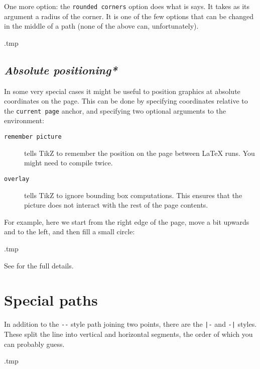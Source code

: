 One more option: the \verb|rounded corners| option does what is says.
It takes as its argument a radius of the corner.
It is one of the few options that can be changed in the middle of a path
(none of the above can, unfortunately).
%
\begin{VerbatimOut}{\jobname.tmp}
\end{VerbatimOut}
\ShowExample


%
%
\subsection{\emph{Absolute positioning*}}\label{sec:tikz absolute}

In some very special cases it might be useful to position graphics at absolute coordinates on the page.
This can be done by specifying coordinates relative to the \verb|current page| anchor,
and specifying two optional arguments to the environment:
\begin{description}
\item[\texttt{remember picture}] tells TikZ to remember the position on the page between \LaTeX{} runs.
    You might need to compile twice.
\item[\texttt{overlay}] tells TikZ to ignore bounding box computations.
    This ensures that the picture does not interact with the rest of the page contents.
\end{description}

For example, here we start from the right edge of the page,
move a bit upwards and to the left, and then fill a small circle:
%
\begin{VerbatimOut}{\jobname.tmp}
\end{VerbatimOut}
\ExecuteExample
%
See \cite[Section~17.3.2]{tikz} for the full details.



%
%
%
\section{Special paths}

In addition to the \verb|--| style path joining two points,
there are the \verb$|-$ and \verb$-|$ styles.
These split the line into vertical and horizontal segments,
the order of which you can probably guess.
%
\begin{VerbatimOut}{\jobname.tmp}
\end{VerbatimOut}
\ShowExample

